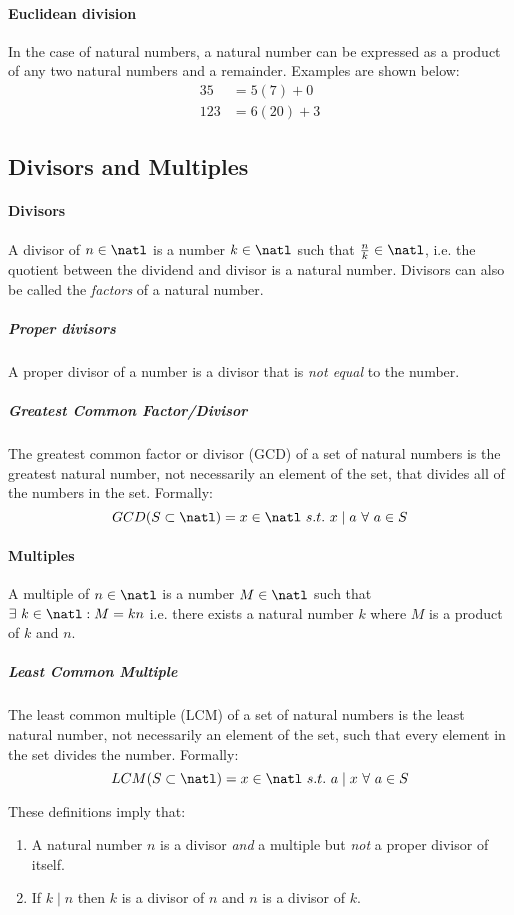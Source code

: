 \paragraph{Euclidean division}
In the case of natural numbers, a natural number can be expressed as a product of any two natural numbers and a remainder.
Examples are shown below:
\begin{align*}
    35 &= 5(7) + 0 \\
    123 &= 6(20) + 3
\end{align*}

\subsection{Divisors and Multiples}
\paragraph{Divisors}
A divisor of $n \in \natl$ is a number $k \in \natl$ such that $\frac{n}{k} \in \natl$, i.e. the quotient between the dividend and divisor is a natural number.
Divisors can also be called the \emph{factors} of a natural number.

\subparagraph{Proper divisors}
A proper divisor of a number is a divisor that is \emph{not equal} to the number.

\subparagraph{Greatest Common Factor/Divisor}
The greatest common factor or divisor (GCD) of a set of natural numbers is the greatest natural number, not necessarily an element of the set, that divides all of the numbers in the set.
Formally:
\[
GCD(S \subset \natl) = x \in \natl\ s.t.\ x \mid a\ \forall\ a \in S
\]

\paragraph{Multiples}
A multiple of $n \in \natl$ is a number $M \in \natl$ such that $\exists\ k \in \natl : M = kn$ i.e. there exists a natural number $k$ where $M$ is a product of $k$ and $n$.

\subparagraph{Least Common Multiple}
The least common multiple (LCM) of a set of natural numbers is the least natural number, not necessarily an element of the set, such that every element in the set divides the number.
Formally:
\[
LCM(S \subset \natl) = x \in \natl\ s.t.\ a \mid x\ \forall\ a \in S
\]

These definitions imply that:
\begin{enumerate}
    \item A natural number $n$ is a divisor \emph{and} a multiple but \emph{not} a proper divisor of itself.
    \item If $k \mid n$ then $k$ is a divisor of $n$ and $n$ is a divisor of $k$.
\end{enumerate}

